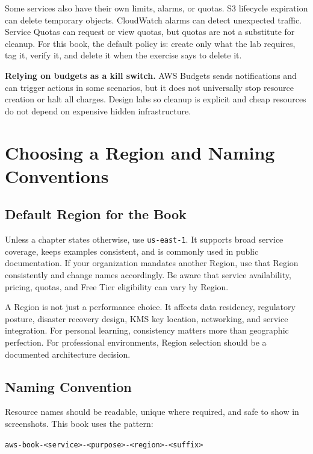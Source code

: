 Some services also have their own limits, alarms, or quotas. S3 lifecycle expiration can delete temporary objects. CloudWatch alarms can detect unexpected traffic. Service Quotas can request or view quotas, but quotas are not a substitute for cleanup. For this book, the default policy is: create only what the lab requires, tag it, verify it, and delete it when the exercise says to delete it.

\begin{pitfall}
\textbf{Relying on budgets as a kill switch.} AWS Budgets sends notifications and can trigger actions in some scenarios, but it does not universally stop resource creation or halt all charges. Design labs so cleanup is explicit and cheap resources do not depend on expensive hidden infrastructure.
\end{pitfall}

\section{Choosing a Region and Naming Conventions}
\subsection{Default Region for the Book}
Unless a chapter states otherwise, use \texttt{us-east-1}. It supports broad service coverage, keeps examples consistent, and is commonly used in public documentation. If your organization mandates another Region, use that Region consistently and change names accordingly. Be aware that service availability, pricing, quotas, and Free Tier eligibility can vary by Region.

A Region is not just a performance choice. It affects data residency, regulatory posture, disaster recovery design, KMS key location, networking, and service integration. For personal learning, consistency matters more than geographic perfection. For professional environments, Region selection should be a documented architecture decision.

\subsection{Naming Convention}
Resource names should be readable, unique where required, and safe to show in screenshots. This book uses the pattern:

\begin{center}
\texttt{aws-book-<service>-<purpose>-<region>-<suffix>}
\end{center}

